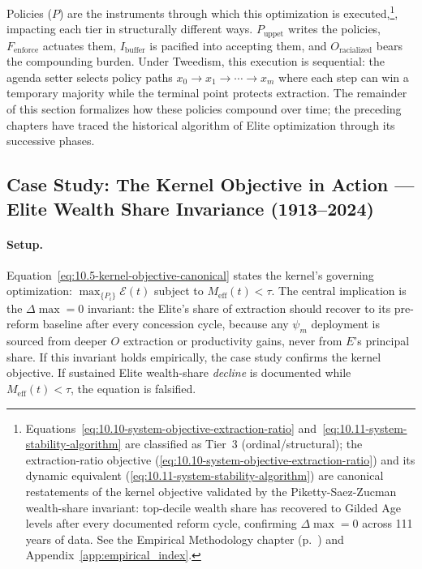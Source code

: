 Policies ($P$) are the instruments through which this optimization is executed,\footnote{Equations~\ref{eq:10.10-system-objective-extraction-ratio} and~\ref{eq:10.11-system-stability-algorithm} are classified as Tier~3 (ordinal/structural); the extraction-ratio objective (\ref{eq:10.10-system-objective-extraction-ratio}) and its dynamic equivalent (\ref{eq:10.11-system-stability-algorithm}) are canonical restatements of the kernel objective validated by the Piketty-Saez-Zucman wealth-share invariant: top-decile wealth share has recovered to Gilded Age levels after every documented reform cycle, confirming $\Delta\max = 0$ across 111 years of data. See the Empirical Methodology chapter (p.~\pageref{ch:empirical_methodology}) and Appendix~\ref{app:empirical_index}.}, impacting each tier in structurally different ways. $P_{\text{uppet}}$ writes the policies, $F_{\text{enforce}}$ actuates them, $I_{\text{buffer}}$ is pacified into accepting them, and $O_{\text{racialized}}$ bears the compounding burden. Under Tweedism, this execution is sequential: the agenda setter selects policy paths $x_0 \rightarrow x_1 \rightarrow \cdots \rightarrow x_m$ where each step can win a temporary majority while the terminal point protects extraction. The remainder of this section formalizes how these policies compound over time; the preceding chapters have traced the historical algorithm of Elite optimization through its successive phases.

\subsection*{Case Study: The Kernel Objective in Action --- Elite Wealth Share Invariance (1913--2024)}
\label{cs:kernel_objective}

\paragraph{Setup.}
Equation~\ref{eq:10.5-kernel-objective-canonical} states the kernel's governing optimization: $\max_{\{P_i\}} \mathcal{E}(t)$ subject to $M_{\text{eff}}(t) < \tau$. The central implication is the $\Delta\max = 0$ invariant: the Elite's share of extraction should recover to its pre-reform baseline after every concession cycle, because any $\psi_m$ deployment is sourced from deeper $O$ extraction or productivity gains, never from $E$'s principal share. If this invariant holds empirically, the case study confirms the kernel objective. If sustained Elite wealth-share \textit{decline} is documented while $M_{\text{eff}}(t) < \tau$, the equation is falsified.

